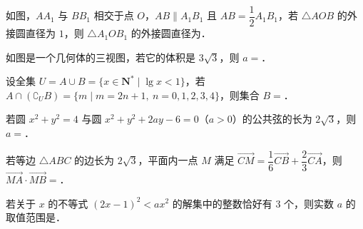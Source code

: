 \Needspace{0.4\textheight}
\begin{question}
如图，$AA_1$ 与 $BB_1$ 相交于点 $O$，$AB\parallel A_1B_1$ 且 $AB=\dfrac12A_1B_1$，若 $\triangle AOB$ 的外接圆直径为 $1$，则 $\triangle A_1OB_1$ 的外接圆直径为\gkblank{}．
\nopagebreak[4]
\begin{center}\end{center}
\nopagebreak[4]
\Needspace{0.4\textheight}
\end{question}
\begin{question}
如图是一个几何体的三视图，若它的体积是 $3\sqrt3$，则 $a=$\gkblank{}．
\nopagebreak[4]
\begin{center}\end{center}
\nopagebreak[4]
\end{question}
\begin{question}
设全集 $U=A\cup B=\{x\in\mathbf N^*\mid \lg x<1\}$，若 $A\cap(\complement_UB)=\{m\mid m=2n+1,\ n=0,1,2,3,4\}$，则集合 $B=$\gkblank{}．

\end{question}
\begin{question}
若圆 $x^2+y^2=4$ 与圆 $x^2+y^2+2ay-6=0$（$a>0$）的公共弦的长为 $2\sqrt3$，则 $a=$\gkblank{}．

\end{question}
\begin{question}
若等边 $\triangle ABC$ 的边长为 $2\sqrt3$，平面内一点 $M$ 满足 $\overrightarrow{CM}=\dfrac16\overrightarrow{CB}+\dfrac23\overrightarrow{CA}$，则 $\overrightarrow{MA}\cdot\overrightarrow{MB}=$\gkblank{}．

\end{question}
\begin{question}
若关于 $x$ 的不等式 $(2x-1)^2<ax^2$ 的解集中的整数恰好有 $3$ 个，则实数 $a$ 的取值范围是\gkblank{}．

\end{question}

